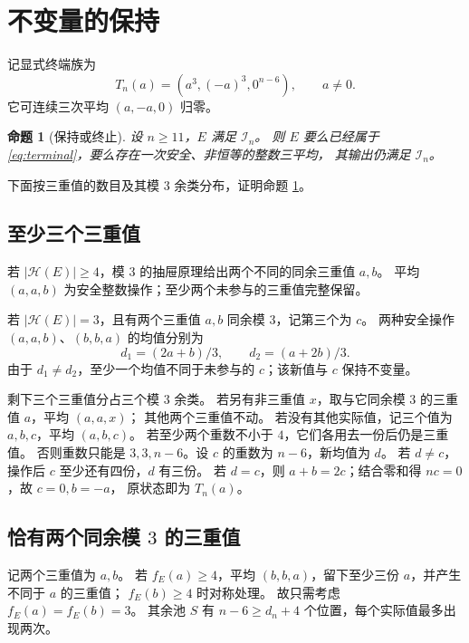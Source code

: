 \documentclass[UTF8,fontset=fandol,zihao=-4,a4paper]{ctexart}
\numberwithin{equation}{section}
\newtheorem{proposition}[theorem]{命题}
\theoremstyle{definition}
\newcommand{\HH}{\mathcal H}
\newcommand{\II}{\mathcal I}
\begin{document}
\section{不变量的保持}\label{sec:closure}

记显式终端族为
\begin{equation}\label{eq:terminal}
 T_n(a)=(a^3,(-a)^3,0^{n-6}),\qquad a\ne0.
\end{equation}
它可连续三次平均 $(a,-a,0)$ 归零。

\begin{proposition}[保持或终止]\label{prop:closure}
设 $n\ge11$，$E$ 满足 $\II_n$。
则 $E$ 要么已经属于 \eqref{eq:terminal}，要么存在一次安全、非恒等的整数三平均，
其输出仍满足 $\II_n$。
\end{proposition}

下面按三重值的数目及其模 $3$ 余类分布，证明命题 \ref{prop:closure}。

\subsection{至少三个三重值}

若 $|\HH(E)|\ge4$，模 $3$ 的抽屉原理给出两个不同的同余三重值 $a,b$。
平均 $(a,a,b)$ 为安全整数操作；至少两个未参与的三重值完整保留。

若 $|\HH(E)|=3$，且有两个三重值 $a,b$ 同余模 $3$，记第三个为 $c$。
两种安全操作 $(a,a,b)$、$(b,b,a)$ 的均值分别为
\[
 d_1=(2a+b)/3,\qquad d_2=(a+2b)/3.
\]
由于 $d_1\ne d_2$，至少一个均值不同于未参与的 $c$；该新值与 $c$ 保持不变量。

剩下三个三重值分占三个模 $3$ 余类。
若另有非三重值 $x$，取与它同余模 $3$ 的三重值 $a$，平均 $(a,a,x)$；
其他两个三重值不动。
若没有其他实际值，记三个值为 $a,b,c$，平均 $(a,b,c)$。
若至少两个重数不小于 $4$，它们各用去一份后仍是三重值。
否则重数只能是 $3,3,n-6$。设 $c$ 的重数为 $n-6$，新均值为 $d$。
若 $d\ne c$，操作后 $c$ 至少还有四份，$d$ 有三份。
若 $d=c$，则 $a+b=2c$；结合零和得 $nc=0$，故 $c=0,b=-a$，
原状态即为 $T_n(a)$。

\subsection{恰有两个同余模 \texorpdfstring{$3$}{3} 的三重值}

记两个三重值为 $a,b$。
若 $f_E(a)\ge4$，平均 $(b,b,a)$，留下至少三份 $a$，并产生不同于 $a$ 的三重值；
$f_E(b)\ge4$ 时对称处理。
故只需考虑 $f_E(a)=f_E(b)=3$。
其余池 $S$ 有 $n-6\ge d_n+4$ 个位置，每个实际值最多出现两次。
\end{document}
